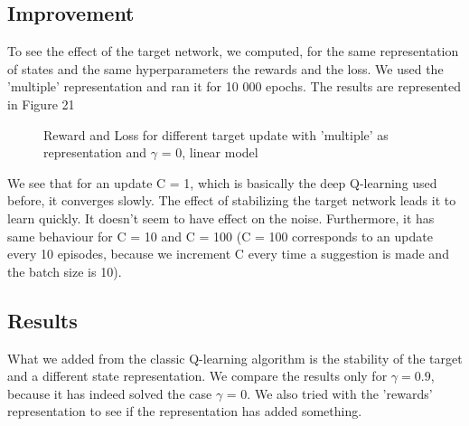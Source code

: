 \documentclass[a4paper]{article}
\begin{document}
\subsection{Improvement} To see the effect of the target network, we computed, for the same representation of states and the same hyperparameters the rewards and the loss. We used the 'multiple' representation and ran it for 10 000 epochs. 
The results are represented in Figure 21
        \begin{figure}[h!]
        \centering
        \qquad
        \caption{Reward and Loss for different target update with 'multiple' as representation and $\gamma$ = 0, linear model }%
        \label{fig:example}%
        \end{figure}

    We see that for an update C = 1, which is basically the deep Q-learning used before, it converges slowly. The effect of stabilizing the target network leads it to learn quickly. It doesn't seem to have effect on the noise. Furthermore, it has same behaviour for C = 10 and C = 100 (C = 100 corresponds to an update every 10 episodes, because we increment C every time a suggestion is made and the batch size is 10). 

\subsection{Results}
    What we added from the classic Q-learning algorithm is the stability of the target and a different state representation.
    We compare the results only for $\gamma = 0.9$, because it has indeed solved the case $\gamma$ = 0. We also tried with the 'rewards' representation to see if the representation has added something.
    
\end{document}

